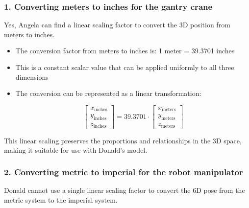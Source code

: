 \begin{solution}

\subsubsection*{1. Converting meters to inches for the gantry crane}

Yes, Angela can find a linear scaling factor to convert the 3D position from meters to inches.

\begin{itemize}
    \item The conversion factor from meters to inches is: 1 meter = 39.3701 inches
    \item This is a constant scalar value that can be applied uniformly to all three dimensions
    \item The conversion can be represented as a linear transformation:
    
    \begin{equation}
        \begin{bmatrix} x_{\text{inches}} \\ y_{\text{inches}} \\ z_{\text{inches}} \end{bmatrix} = 
        39.3701 \cdot \begin{bmatrix} x_{\text{meters}} \\ y_{\text{meters}} \\ z_{\text{meters}} \end{bmatrix}
    \end{equation}
\end{itemize}

This linear scaling preserves the proportions and relationships in the 3D space, making it suitable for use with Donald's model.

\subsubsection*{2. Converting metric to imperial for the robot manipulator}

Donald cannot use a single linear scaling factor to convert the 6D pose from the metric system to the imperial system.


\end{solution}
